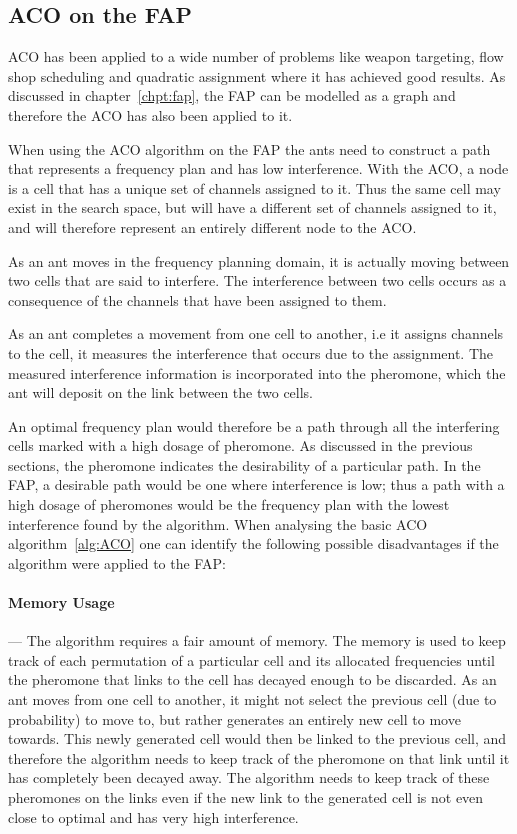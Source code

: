 \subsection{ACO on the \gls{FAP}}
ACO has been applied to a wide number of problems like weapon targeting\cite{WeaponTargetACO}, flow shop scheduling\cite{ACOFlowShop} and quadratic assignment\cite{AntQAP} where it has achieved good results. As discussed in chapter~\ref{chpt:fap}, the \gls{FAP} can be modelled as a graph and therefore the \gls{ACO} has also been applied to it\cite{ACOvsEA}.

When using the \gls{ACO} algorithm on the \gls{FAP} the ants need to construct a path that represents a frequency plan and has low interference. With the \gls{ACO}, a node is a cell that has a unique set of channels assigned to it. Thus the same cell may exist in the search space, but will have a different set of channels assigned to it, and will therefore represent an entirely different node to the \gls{ACO}.

As an ant moves in the frequency planning domain, it is actually moving between two cells that are said to interfere. The interference between two cells occurs as a consequence of the channels that have been assigned to them. 

As an ant completes a movement from one cell to another, i.e it assigns channels to the cell, it measures the interference that occurs due to the assignment.  The measured interference information is incorporated into the pheromone, which the ant will deposit on the link between the two cells.

An optimal frequency plan would therefore be a path through all the interfering cells marked with a high dosage of pheromone. As discussed in the previous sections, the pheromone indicates the desirability of a particular path. In the \gls{FAP}, a desirable path would be one where interference is low; thus a path with a high dosage of pheromones would be the frequency plan with the lowest interference found by the algorithm.
When analysing the basic \gls{ACO} algorithm~\ref{alg:ACO} one can identify the following possible disadvantages if the algorithm were applied to the \gls{FAP}:
\paragraph{Memory Usage}
--- The algorithm requires a fair amount of memory. The memory is used to keep track of each permutation of a particular cell and its allocated frequencies until the pheromone that links to the cell has decayed enough to be discarded. As an ant moves from one cell to another, it might not select the previous cell (due to probability) to move to, but rather generates an entirely new cell to move towards. This newly generated cell would then be linked to the previous cell, and therefore the algorithm needs to keep track of the pheromone on that link until it has completely been decayed away. The algorithm needs to keep track of these pheromones on the links even if the new link to the generated cell is not even close to optimal and has very high interference.
